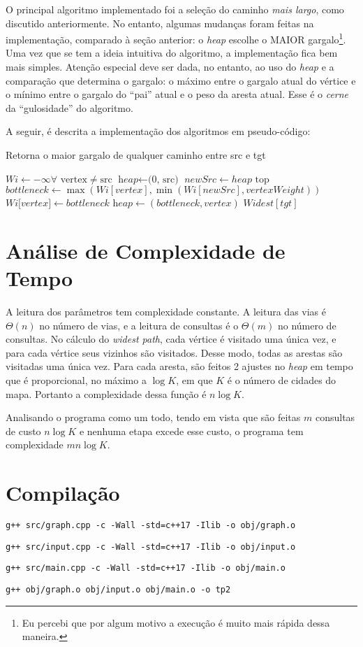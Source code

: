 \documentclass{article}
\begin{document}
O principal algoritmo implementado foi a seleção do caminho \textit{mais largo}, como discutido anteriormente. No entanto, algumas mudanças foram feitas na implementação, comparado à seção anterior: o \textit{heap} escolhe o MAIOR gargalo\footnote{Eu percebi que por algum motivo a execução é muito mais rápida dessa maneira.}. Uma vez que se tem a ideia intuitiva do algoritmo, a implementação fica bem mais simples. Atenção especial deve ser dada, no entanto, ao uso do \textit{heap} e a comparação que determina o gargalo: o máximo entre o gargalo atual do vértice e o mínimo entre o gargalo do ``pai'' atual e o peso da aresta atual. Esse é o \textit{cerne} da ``gulosidade'' do algoritmo.

A seguir, é descrita a implementação dos algoritmos em pseudo-código:
\begin{algorithm}
	\caption{Retorna o maior gargalo de qualquer caminho entre src e tgt}
	\begin{algorithmic}[1]
		\State $\textit{Wi} \gets -\infty \forall \textrm{ vertex} \neq \textrm{src}$
		\State $\textit{heap} \gets \textrm{(0, src)}$
		\State $\textit{newSrc} \gets heap \textrm{ top}$
		\State $\textit{bottleneck} \gets \max (Wi[vertex], \min (Wi[newSrc], vertexWeight))$
		\State $\textit{Wi[vertex]} \gets bottleneck$
		\State $\textit{heap} \gets (bottleneck, vertex)$
		\EndIf
		\EndFor
		\EndWhile
		\State \Return $Widest[tgt]$
		\EndFunction
	\end{algorithmic}
\end{algorithm}

\section{Análise de Complexidade de Tempo}

A leitura dos parâmetros tem complexidade constante. A leitura das vias é \( \Theta(n) \) no número de vias, e a leitura de consultas é o \( \Theta(m) \) no número de consultas. No cálculo do \textit{widest path}, cada vértice é visitado uma única vez, e para cada vértice seus vizinhos são visitados. Desse modo, todas as arestas são visitadas uma única vez. Para cada aresta, são feitos 2 ajustes no \textit{heap} em tempo que é proporcional, no máximo a \( \log K \), em que \( K \) é o número de cidades do mapa. Portanto a complexidade dessa função é \( n \log K \).

Analisando o programa como um todo, tendo em vista que são feitas \( m \) consultas de custo \( n \log K \) e nenhuma etapa excede esse custo, o programa tem complexidade \( mn \log K \).

\section{Compilação}

\texttt{g++ src/graph.cpp -c -Wall -std=c++17 -Ilib -o obj/graph.o}

\texttt{g++ src/input.cpp -c -Wall -std=c++17 -Ilib -o obj/input.o}

\texttt{g++ src/main.cpp -c -Wall -std=c++17 -Ilib -o obj/main.o}

\texttt{g++ obj/graph.o obj/input.o obj/main.o -o tp2}
\end{document}

